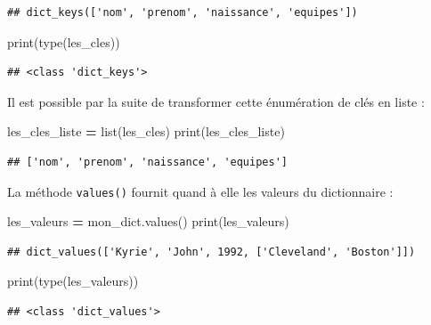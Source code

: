 \documentclass[
  12pt,
]{book}
\newenvironment{Shaded}{\begin{snugshade}}{\end{snugshade}}
\newcommand{\BuiltInTok}[1]{#1}
\newcommand{\NormalTok}[1]{#1}
\newcommand{\OperatorTok}[1]{\textcolor[rgb]{0.81,0.36,0.00}{\textbf{#1}}}
\numberwithin{equation}{section}
\numberwithin{countremarque}{section}
\begin{document}
\begin{lstlisting}
## dict_keys(['nom', 'prenom', 'naissance', 'equipes'])
\end{lstlisting}

\begin{Shaded}
\begin{Highlighting}[]
\BuiltInTok{print}\NormalTok{(}\BuiltInTok{type}\NormalTok{(les\_cles))}
\end{Highlighting}
\end{Shaded}

\begin{lstlisting}
## <class 'dict_keys'>
\end{lstlisting}

Il est possible par la suite de transformer cette énumération de clés en liste :

\begin{Shaded}
\begin{Highlighting}[]
\NormalTok{les\_cles\_liste }\OperatorTok{=} \BuiltInTok{list}\NormalTok{(les\_cles)}
\BuiltInTok{print}\NormalTok{(les\_cles\_liste)}
\end{Highlighting}
\end{Shaded}

\begin{lstlisting}
## ['nom', 'prenom', 'naissance', 'equipes']
\end{lstlisting}

La méthode \texttt{values()} fournit quand à elle les valeurs du dictionnaire :

\begin{Shaded}
\begin{Highlighting}[]
\NormalTok{les\_valeurs }\OperatorTok{=}\NormalTok{ mon\_dict.values()}
\BuiltInTok{print}\NormalTok{(les\_valeurs)}
\end{Highlighting}
\end{Shaded}

\begin{lstlisting}
## dict_values(['Kyrie', 'John', 1992, ['Cleveland', 'Boston']])
\end{lstlisting}

\begin{Shaded}
\begin{Highlighting}[]
\BuiltInTok{print}\NormalTok{(}\BuiltInTok{type}\NormalTok{(les\_valeurs))}
\end{Highlighting}
\end{Shaded}

\begin{lstlisting}
## <class 'dict_values'>
\end{lstlisting}
\end{document}
